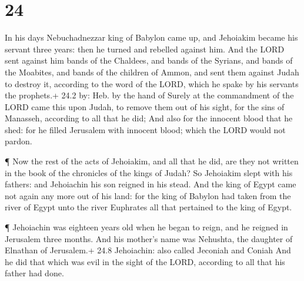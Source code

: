 \hypertarget{section-23}{%
\section{24}\label{section-23}}

 In his days Nebuchadnezzar king of Babylon came up, and
Jehoiakim became his servant three years: then he turned and rebelled
against him.  And the LORD sent against him bands of the
Chaldees, and bands of the Syrians, and bands of the Moabites, and bands
of the children of Ammon, and sent them against Judah to destroy it,
according to the word of the LORD, which he spake by his servants the
prophets.+ 24.2 by: Heb. by the hand of  Surely at the
commandment of the LORD came this upon Judah, to remove them out of his
sight, for the sins of Manasseh, according to all that he did;
 And also for the innocent blood that he shed: for he filled
Jerusalem with innocent blood; which the LORD would not pardon.

 ¶ Now the rest of the acts of Jehoiakim, and all that he
did, are they not written in the book of the chronicles of the kings of
Judah?  So Jehoiakim slept with his fathers: and Jehoiachin
his son reigned in his stead.  And the king of Egypt came
not again any more out of his land: for the king of Babylon had taken
from the river of Egypt unto the river Euphrates all that pertained to
the king of Egypt.

 ¶ Jehoiachin was eighteen years old when he began to reign,
and he reigned in Jerusalem three months. And his mother's name was
Nehushta, the daughter of Elnathan of Jerusalem.+ 24.8 Jehoiachin: also
called Jeconiah and Coniah  And he did that which was evil
in the sight of the LORD, according to all that his father had done.

